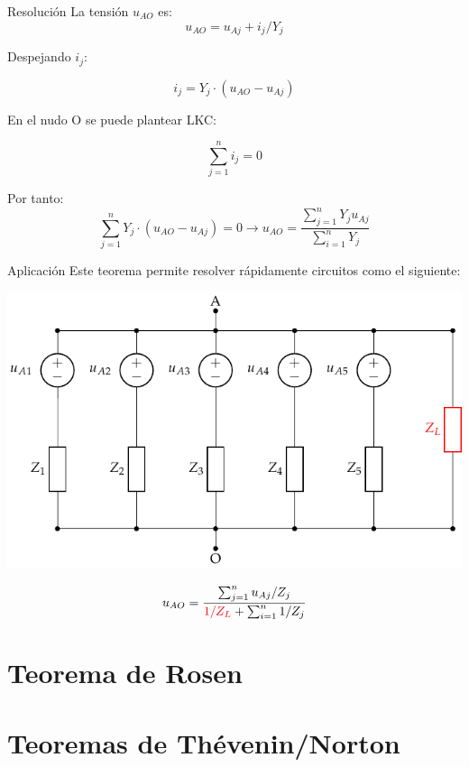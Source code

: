 \documentclass[aspectratio=169, usenames,svgnames,dvipsnames]{beamer}
\begin{document}
\begin{frame}[label={sec:org674df46}]{Resolución}
La tensión \(u_{AO}\) es:
\[
  u_{AO} = u_{Aj} + i_j/Y_j
\]

Despejando \(i_j\):

\[
  i_j = Y_j \cdot (u_{AO} - u_{Aj})
\]

En el nudo O se puede plantear LKC:

\[
  \sum_{j = 1}^n i_j = 0
\]

Por tanto:
\[
  \sum_{j = 1}^n Y_j \cdot (u_{AO} - u_{Aj}) = 0 \rightarrow \boxed{u_{AO} = \frac{\sum_{j = 1}^n Y_j u_{Aj}}{\sum_{i = 1}^n Y_j}}
\]
\end{frame}

\begin{frame}[label={sec:orge9c3f22}]{Aplicación}
Este teorema permite resolver rápidamente circuitos como el siguiente:

\begin{center}
\includegraphics[height=0.6\textheight]{../figs/Millman_aplicacion.pdf}
\end{center}

\[
  u_{AO} = \frac{\sum_{j = 1}^n u_{Aj}/Z_j}{{\color{red} 1/Z_L} + \sum_{i = 1}^n 1/Z_j}
\]
\end{frame}

\section{Teorema de Rosen}
\label{sec:org7976837}

\section{Teoremas de Thévenin/Norton}
\label{sec:org9f10cb7}
\end{document}
